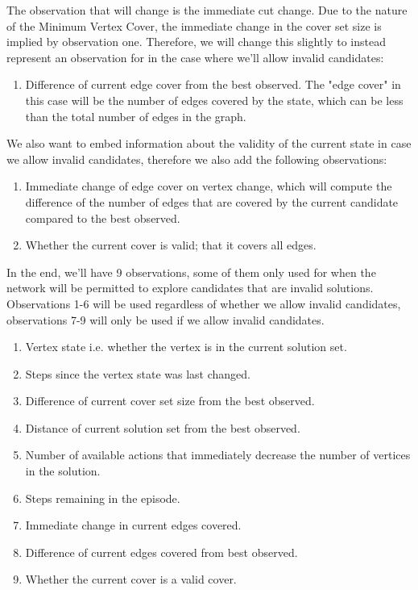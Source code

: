 \documentclass{article}
\begin{document}
The observation that will change is the immediate cut change. Due to the nature of the Minimum Vertex Cover, the immediate change in the cover set size is implied by observation one. Therefore, we will change this slightly to instead represent an observation for in the case where we'll allow invalid candidates: 

\begin{enumerate}
    \item Difference of current edge cover from the best observed. The "edge cover" in this case will be the number of edges covered by the state, which can be less than the total number of edges in the graph.
\end{enumerate}

We also want to embed information about the validity of the current state in case we allow invalid candidates, therefore we also add the following observations: 

\begin{enumerate}
    \item Immediate change of edge cover on vertex change, which will compute the difference of the number of edges that are covered by the current candidate compared to the best observed.
    \item Whether the current cover is valid; that it covers all edges.
\end{enumerate}

In the end, we'll have 9 observations, some of them only used for when the network will be permitted to explore candidates that are invalid solutions. Observations 1-6 will be used regardless of whether we allow invalid candidates, observations 7-9 will only be used if we allow invalid candidates.

\begin{enumerate}
    \item Vertex state i.e. whether the vertex is in the current solution set.
    \item Steps since the vertex state was last changed.
    \item Difference of current cover set size from the best observed.
    \item Distance of current solution set from the best observed. 
    \item Number of available actions that immediately decrease the number of vertices in the solution.
    \item Steps remaining in the episode.
    \item Immediate change in current edges covered.
    \item Difference of current edges covered from best observed.
    \item Whether the current cover is a valid cover.
\end{enumerate}
\end{document}

